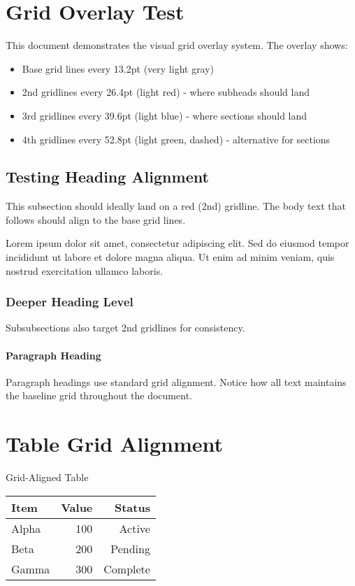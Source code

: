 \documentclass[11pt]{article}
\begin{document}
\section{Grid Overlay Test}

This document demonstrates the visual grid overlay system. The overlay shows:
\begin{itemize}
\item Base grid lines every 13.2pt (very light gray)
\item 2nd gridlines every 26.4pt (light red) - where subheads should land
\item 3rd gridlines every 39.6pt (light blue) - where sections should land
\item 4th gridlines every 52.8pt (light green, dashed) - alternative for sections
\end{itemize}

\subsection{Testing Heading Alignment}

This subsection should ideally land on a red (2nd) gridline. The body text that follows should align to the base grid lines.

Lorem ipsum dolor sit amet, consectetur adipiscing elit. Sed do eiusmod tempor incididunt ut labore et dolore magna aliqua. Ut enim ad minim veniam, quis nostrud exercitation ullamco laboris.

\subsubsection{Deeper Heading Level}

Subsubsections also target 2nd gridlines for consistency.

\paragraph{Paragraph Heading}
Paragraph headings use standard grid alignment. Notice how all text maintains the baseline grid throughout the document.

\section{Table Grid Alignment}

\begin{gridtable}
  \caption{Grid-Aligned Table}
  \centering
  \begin{tabular}{@{}lrr@{}}
    \toprule
    Item & Value & Status \\
    \midrule
    Alpha & 100 & Active \\
    Beta & 200 & Pending \\
    Gamma & 300 & Complete \\
    \bottomrule
  \end{tabular}
\end{gridtable}
\end{document}

